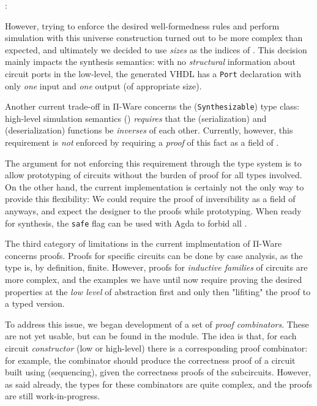             \begin{center}
                 :  \AY{(}  \AY{)} 
            \end{center}

            However, trying to enforce the desired well-formedness rules and perform simulation
            with this universe construction turned out to be more complex than expected,
            and ultimately we decided to use \emph{sizes} as the indices of .
            This decision mainly impacts the synthesis semantics:
            with no \emph{structural} information about circuit ports in the low-level,
            the generated \ac{VHDL} has a \texttt{Port} declaration with only
            \emph{one} input and \emph{one} output (of appropriate size).

            Another current trade-off in Π-Ware concerns the  (\texttt{Synthesizable})
            type class: high-level simulation semantics () \emph{requires} that the
             (serialization) and  (deserialization) functions be \emph{inverses} of each other.
            Currently, however, this requirement is \emph{not} enforced by requiring a \emph{proof} of
            this fact as a field of .

            The argument for not enforcing this requirement through the type system is to allow
            prototyping of circuits without the burden of proof for all types involved.
            On the other hand, the current implementation is certainly not the only way to provide this flexibility:
            We could require the proof of inversibility as a field of  anyways,
            and expect the designer to  the proofs while prototyping.
            When ready for synthesis, the \texttt{safe} flag can be used with Agda to forbid all .

            The third category of limitations in the current implmentation of Π-Ware concerns proofs.
            Proofs for specific circuits can be done by case analysis, as the  type is,
            by definition, finite.
            However, proofs for \emph{inductive families} of circuits are more complex, and
            the examples we have until now require proving the desired properties at the
            \emph{low level} of abstraction first and only then "lifiting" the proof to a
            typed version.

            To address this issue, we began development of a set of \emph{proof combinators}.
            These are not yet usable, but can be found in the  module.
            The idea is that, for each circuit \emph{constructor} (low or high-level) there is
            a corresponding proof combinator: for example, the  combinator should produce the
            correctness proof of a circuit built using  (sequencing), given the correctness
            proofs of the subcircuits.
            However, as said already, the types for these combinators are quite complex,
            and the proofs are still work-in-progress.

